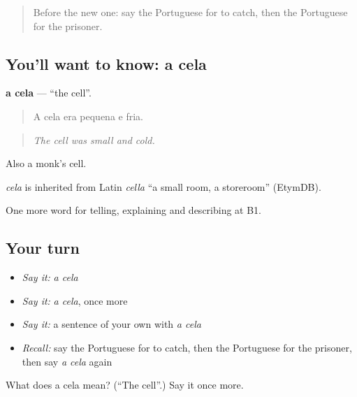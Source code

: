\label{lesson:PT-C296-cela}



\begin{quote}
Before the new one: say the Portuguese for to catch, then the Portuguese for the prisoner.
\end{quote}

\subsection*{You'll want to know: a cela}
\textbf{a cela} — \textquotedblleft{}the cell\textquotedblright{}.

\begin{quote}
A cela era pequena e fria.
\end{quote}

\begin{quote}
\emph{The cell was small and cold.}
\end{quote}

Also a monk’s cell.

\begin{cousinweb}
\emph{cela} is inherited from Latin \emph{cella} \textquotedblleft{}a small room, a storeroom\textquotedblright{} (EtymDB).
\end{cousinweb}

\begin{grammarlens}[title={What you've built}]
One more word for telling, explaining and describing at B1.
\end{grammarlens}

\subsection*{Your turn}
\begin{itemize}
\raggedright
  \item \emph{Say it:} \emph{a cela}
  \item \emph{Say it:} \emph{a cela}, once more
  \item \emph{Say it:} a sentence of your own with \emph{a cela}
  \item \emph{Recall:} say the Portuguese for to catch, then the Portuguese for the prisoner, then say \emph{a cela} again
\end{itemize}

\begin{tcolorbox}[breakable,colback=teal!4,colframe=teal!35!black,title={Before you move on}]
What does a cela mean? (\textquotedblleft{}The cell\textquotedblright{}.) Say it once more.
\end{tcolorbox}
